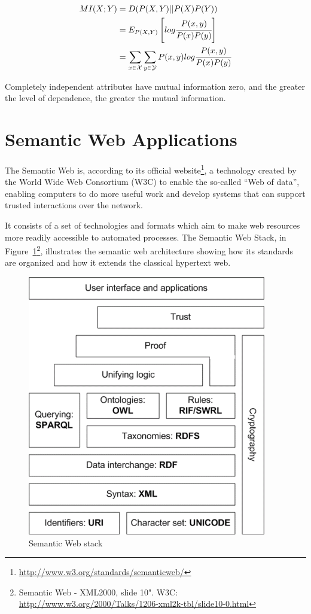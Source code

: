 \begin{equation} \label{eq:mutualInformation}
\begin{split}
 MI(X;Y)&=D(P(X,Y)||P(X)P(Y)) \\
 &=E_{P(X,Y)}\left[ log\cfrac{P(x,y)}{P(x)P(y)} \right] \\
 &=\sum_{x \in \mathcal{X}} \sum_{y \in \mathcal{Y}} P(x,y)log\cfrac{P(x,y)}{P(x)P(y)}
\end{split}
\end{equation}

Completely independent attributes have mutual information zero, and the greater the level of dependence, the greater
the mutual information.


\cite{DBLP:conf/sac/CaldersGPR09}
\cite{Vinh:2010:ITM:1953011.1953024}


\section{Semantic Web Applications}
\label{sec:rw-semanticWeb}

The Semantic Web is, according to its official website\footnote{\url{http://www.w3.org/standards/semanticweb/}}, a
technology created by the World Wide Web Consortium (W3C) to enable the so-called ``Web of data'', enabling computers
to do more useful work and develop systems that can support trusted interactions over the network. 

It consists of a set of technologies and formats which aim to make web resources more readily accessible to automated
processes. The Semantic Web Stack, in Figure~\ref{fig:sematicWebLayer}\footnote{Semantic Web - XML2000, slide 10".
W3C: \url{http://www.w3.org/2000/Talks/1206-xml2k-tbl/slide10-0.html}}, illustrates the semantic web architecture
showing how its standards are organized and how it extends the classical hypertext web.

\begin{figure}
\label{fig:sematicWebLayer}
\begin{center}
  \includegraphics[width=0.5\linewidth]{./Figures/Semantic-web-stack.png}
\end{center}
\caption{Semantic Web stack}
\end{figure}


